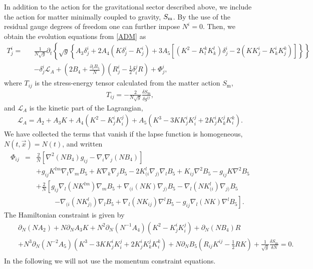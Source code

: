 \documentclass[aps,prd,preprint,superscriptaddress,nofootinbib,tightenlines]{revtex4-1}
\begin{document}
In addition to the action for
the gravitational sector described above,
we include the action for matter minimally coupled to gravity, $S_{\rm m}$.
By the use of the residual gauge degrees of freedom one can
further impose $N^i=0$.
Then, we obtain the evolution equations from \eqref{ADM} as
\begin{eqnarray}
T^i_j=
&&\frac{1}{ N\sqrt{g} } \partial_t
\left\{
\sqrt{g}
\left\{
A_3 \delta^i_j
+ 2 A_4(K\delta^i_j - K^i_j)
+ 3 A_5 [(K^2-K^k_l K^l_k)\delta^i_j - 2 (KK^i_j - K^i_k K^k_j)]
\right\}
\right\}
\nonumber\\
&&
- \delta^i_j \mathcal{L}_A
+ \left(2 B_4 + \frac{ \partial_t B_5}{N} \right)\left(
 R^i_j-\frac{1}{2}\delta_i^jR\right)
+\Phi^i_j ,\label{Einstein}
\end{eqnarray}
where $T_{ij}$ is the stress-energy tensor calculated from the matter action $S_\mathrm{m}$,
\begin{eqnarray}
T_{ij} = - \frac{2}{N\sqrt{g}} \frac{\delta S_\mathrm{m}}{\delta g^{ij}} ,
\end{eqnarray}
and
$\mathcal{L}_A$ is the kinetic part of
the Lagrangian,
\begin{eqnarray}
\mathcal{L}_A = A_2 + A_3 K + A_4 (K^2-K^i_j K^j_i) + A_5 (K^3 - 3 K K^i_j K^j_i + 2K^i_j K^j_k K^k_i) .
\end{eqnarray}
We have collected the terms that vanish
if the lapse function is homogeneous, $N(t,\Vec{x})=N(t)$,
and written
\begin{eqnarray}
\Phi_{ij}
&=&
\frac{2}{N}[\nabla^2(NB_4)g_{ij} - \nabla_i \nabla_j (NB_4)]
\nonumber\\
&&+
g_{ij} K^{lm} \nabla_l \nabla_m B_5
+ K \nabla_k \nabla_j B_5
- 2 K^l_{(i} \nabla_{j)} \nabla_l B_5
+ K_{ij} \nabla^2 B_5
- g_{ij} K\nabla^2B_5
\nonumber\\
&&
+ \frac{2}{N}  \left[
g_{ij}\nabla_l (NK^{lm})\nabla_m B_5
+ \nabla_{(i}(NK)\nabla_{j)}B_5
- \nabla_l (NK^l_{(i}) \nabla_{j)} B_5
\right.
\nonumber\\
&&~~~~~~~~~~~~
\left.
- \nabla_{(i} (NK^l_{j)}) \nabla_l B_5
+ \nabla_l (NK_{ij}) \nabla^l B_5
- g_{ij} \nabla_l (NK) \nabla^l B_5
\right] .
\end{eqnarray}
The Hamiltonian constraint is given by
\begin{eqnarray}
&&\partial_N (NA_2) + N \partial_N A_3 K + N^2 \partial_N (N^{-1} A_4)(K^2 - K^i_j K^j_i) + \partial_N (NB_4) R \nonumber\\
&&+ N^3 \partial_N (N^{-2}A_5)(K^3 - 3 K K^i_j K^j_i + 2K^i_j K^j_k K^k_i) + N \partial_N B_5 \left(R_{ij} K^{ij}-\frac{1}{2}RK\right)
 + \frac{1}{\sqrt{g}}\frac{\delta S_\mathrm{m} }{\delta N} = 0.
 \nonumber\\
\label{Hamiltonian}
\end{eqnarray}
In the following we will not use the momentum constraint equations.
\end{document}
